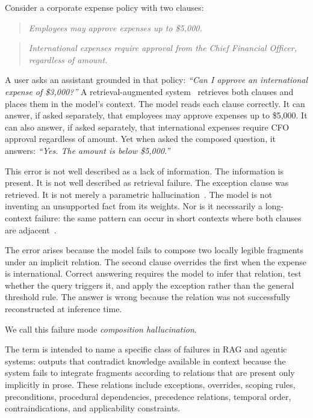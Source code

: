 \documentclass[11pt]{article}
\begin{document}
Consider a corporate expense policy with two clauses:

\begin{quote}
\emph{Employees may approve expenses up to \$5,000.}
\end{quote}

\begin{quote}
\emph{International expenses require approval from the Chief Financial Officer, regardless of amount.}
\end{quote}

A user asks an assistant grounded in that policy: \emph{``Can I approve an international expense of \$3,000?''} A retrieval-augmented system~\cite{lewis2020rag} retrieves both clauses and places them in the model's context. The model reads each clause correctly. It can answer, if asked separately, that employees may approve expenses up to \$5,000. It can also answer, if asked separately, that international expenses require CFO approval regardless of amount. Yet when asked the composed question, it answers: \emph{``Yes. The amount is below \$5,000.''}

This error is not well described as a lack of information. The information is present. It is not well described as retrieval failure. The exception clause was retrieved. It is not merely a parametric hallucination~\cite{ji2023survey,huang2023hallucination}. The model is not inventing an unsupported fact from its weights. Nor is it necessarily a long-context failure: the same pattern can occur in short contexts where both clauses are adjacent~\cite{liu2024lost}.

The error arises because the model fails to compose two locally legible fragments under an implicit relation. The second clause overrides the first when the expense is international. Correct answering requires the model to infer that relation, test whether the query triggers it, and apply the exception rather than the general threshold rule. The answer is wrong because the relation was not successfully reconstructed at inference time.

We call this failure mode \emph{composition hallucination}.

The term is intended to name a specific class of failures in RAG and agentic systems: outputs that contradict knowledge available in context because the system fails to integrate fragments according to relations that are present only implicitly in prose. These relations include exceptions, overrides, scoping rules, preconditions, procedural dependencies, precedence relations, temporal order, contraindications, and applicability constraints.
\end{document}
